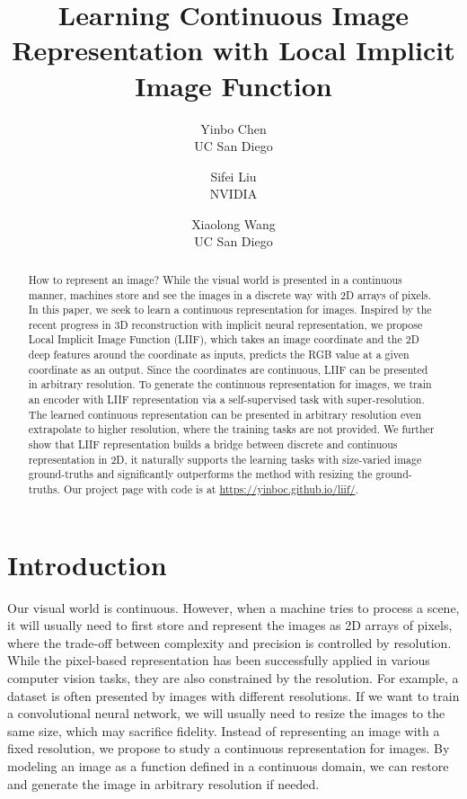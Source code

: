 \documentclass[final]{cvpr}
\begin{document}
\title{Learning Continuous Image Representation with Local Implicit Image Function}

\author{Yinbo Chen\\
UC San Diego
\and
Sifei Liu\\
NVIDIA
\and
Xiaolong Wang\\
UC San Diego
}

\maketitle


\begin{abstract}
How to represent an image? While the visual world is presented in a continuous manner, machines store and see the images in a discrete way with 2D arrays of pixels. In this paper, we seek to learn a continuous representation for images. Inspired by the recent progress in 3D reconstruction with implicit neural representation, we propose Local Implicit Image Function (LIIF), which takes an image coordinate and the 2D deep features around the coordinate as inputs, predicts the RGB value at a given coordinate as an output. Since the coordinates are continuous, LIIF can be presented in arbitrary resolution. To generate the continuous representation for images, we train an encoder with LIIF representation via a self-supervised task with super-resolution. The learned continuous representation can be presented in arbitrary resolution even extrapolate to  higher resolution, where the training tasks are not provided. We further show that LIIF representation builds a bridge between discrete and continuous representation in 2D, it naturally supports the learning tasks with size-varied image ground-truths and significantly outperforms the method with resizing the ground-truths. Our project page with code is at \url{https://yinboc.github.io/liif/}.
\end{abstract}



\section{Introduction}

Our visual world is continuous. However, when a machine tries to process a scene, it will usually need to first store and represent the images as 2D arrays of pixels, where the trade-off between complexity and precision is controlled by resolution. While the pixel-based representation has been successfully applied in various computer vision tasks, they are also constrained by the resolution. For example, a dataset is often presented by images with different resolutions. If we want to train a convolutional neural network, we will usually need to resize the images to the same size, which may sacrifice fidelity. Instead of representing an image with a fixed resolution, we propose to study a continuous representation for images. By modeling an image as a function defined in a continuous domain, we can restore and generate the image in arbitrary resolution if needed. 
\end{document}
